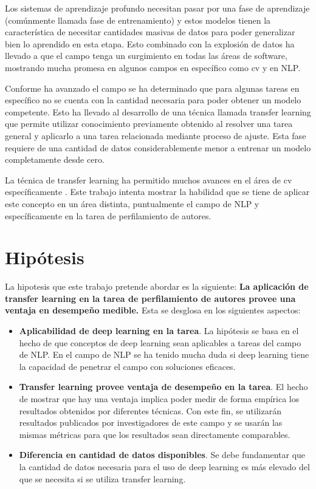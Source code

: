 Los sistemas de aprendizaje profundo necesitan pasar por una fase de aprendizaje (comúnmente llamada fase de \gls{entrenamiento}) y estos modelos tienen la característica de necesitar cantidades masivas de datos para poder generalizar bien lo aprendido en esta etapa. Esto combinado con la explosión de datos ha llevado a que el campo tenga un surgimiento en todas las áreas de software, mostrando mucha promesa en algunos campos en específico como \gls{cv} \parencite{hoo2016deep} y en NLP.

Conforme ha avanzado el campo se ha determinado que para algunas tareas en específico no se cuenta con la cantidad necesaria para poder obtener un modelo competente. Esto ha llevado al desarrollo de una técnica llamada transfer learning que permite utilizar conocimiento previamente obtenido al resolver una tarea general y aplicarlo a una tarea relacionada mediante proceso de ajuste. Esta fase requiere de una cantidad de datos considerablemente menor a entrenar un modelo completamente desde cero.

La técnica de transfer learning ha permitido muchos avances en el área de \gls{cv} específicamente \parencite{hoo2016deep}. Este trabajo intenta mostrar la habilidad que se tiene de aplicar este concepto en un área distinta, puntualmente el campo de NLP y específicamente en la tarea de \gls{perfilamiento de autores}.

\section{Hipótesis}

La hipotesis que este trabajo pretende abordar es la siguiente: \textbf{La aplicación de transfer learning en la tarea de perfilamiento de autores provee una ventaja en desempeño medible.} Esta se desglosa en los siguientes aspectos:

\begin{itemize}
\item \textbf{Aplicabilidad de deep learning en la tarea}. La hipótesis se basa en el hecho de que conceptos de deep learning sean aplicables a tareas del campo de NLP. En el campo de NLP se ha tenido mucha duda si deep learning tiene la capacidad de penetrar el campo con soluciones eficaces.

\item \textbf{Transfer learning provee ventaja de desempeño en la tarea}. El hecho de mostrar que hay una ventaja implica poder medir de forma empírica los resultados obtenidos por diferentes técnicas. Con este fin, se utilizarán resultados publicados por investigadores de este campo y se usarán las mismas métricas para que los resultados sean directamente comparables.

\item \textbf{Diferencia en cantidad de datos disponibles}. Se debe fundamentar que la cantidad de datos necesaria para el uso de deep learning es más elevado del que se necesita si se utiliza transfer learning.
\end{itemize}

